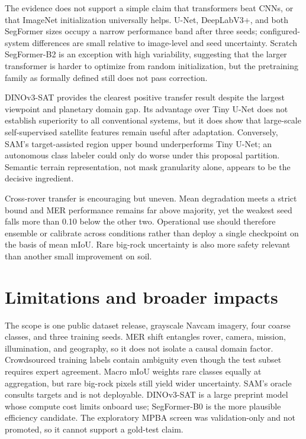 \documentclass{article}
\newcommand{\miou}{\ensuremath{\mathrm{mIoU}}}
\begin{document}
The evidence does not support a simple claim that transformers beat CNNs, or that ImageNet
initialization universally helps. U-Net, DeepLabV3+, and both SegFormer sizes occupy a narrow
performance band after three seeds; configured-system differences are small relative to
image-level and seed uncertainty. Scratch SegFormer-B2 is an exception with high variability,
suggesting that the larger transformer is harder to optimize from random initialization, but the
pretraining family as formally defined still does not pass correction.

DINOv3-SAT provides the clearest positive transfer result despite the largest viewpoint and
planetary domain gap. Its advantage over Tiny U-Net does not establish superiority to all
conventional systems, but it does show that large-scale self-supervised satellite features remain
useful after adaptation. Conversely, SAM's target-assisted region upper bound underperforms Tiny
U-Net; an autonomous class labeler could only do worse under this proposal partition. Semantic
terrain representation, not mask granularity alone, appears to be the decisive ingredient.

Cross-rover transfer is encouraging but uneven. Mean degradation meets a strict bound and MER
performance remains far above majority, yet the weakest seed falls more than 0.10 below the other
two. Operational use should therefore ensemble or calibrate across conditions rather than deploy a
single checkpoint on the basis of mean \miou{}. Rare big-rock uncertainty is also more safety
relevant than another small improvement on soil.

\section{Limitations and broader impacts}

The scope is one public dataset release, grayscale Navcam imagery, four coarse classes, and three
training seeds. MER shift entangles rover, camera, mission, illumination, and geography, so it does
not isolate a causal domain factor. Crowdsourced training labels contain ambiguity even though the
test subset requires expert agreement. Macro \miou{} weights rare classes equally at aggregation,
but rare big-rock pixels still yield wider uncertainty. SAM's oracle consults targets and is not
deployable. DINOv3-SAT is a large preprint model whose compute cost limits onboard use; SegFormer-B0
is the more plausible efficiency candidate. The exploratory MPBA screen was validation-only and
not promoted, so it cannot support a gold-test claim.
\end{document}
